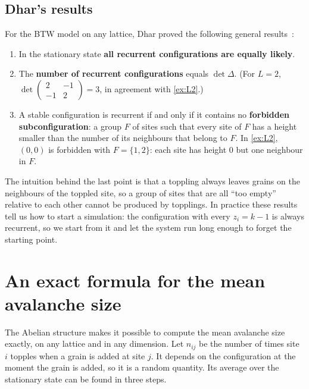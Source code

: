 \subsection{Dhar's results}

For the BTW model on any lattice, Dhar proved the following general results~\cite{Dhar1990,Dhar2006}:
\begin{enumerate}
  \item In the stationary state \textbf{all recurrent configurations are equally likely}.
  \item The \textbf{number of recurrent configurations} equals $\det\Delta$. (For $L=2$,
    $\det\begin{pmatrix}2&-1\\-1&2\end{pmatrix} = 3$, in agreement with \cref{ex:L2}.)
  \item A stable configuration is recurrent if and only if it contains no \textbf{forbidden subconfiguration}: a
    group $F$ of sites such that every site of $F$ has a height smaller than the number of its neighbours that
    belong to $F$. In \cref{ex:L2}, $(0,0)$ is forbidden with $F=\{1,2\}$: each site has height 0 but one neighbour in $F$.
\end{enumerate}
The intuition behind the last point is that a toppling always leaves grains on the neighbours of the toppled site, so
a group of sites that are all ``too empty'' relative to each other cannot be produced by topplings. In practice
these results tell us how to start a simulation: the configuration with every $z_i=k-1$ is always recurrent, so we
start from it and let the system run long enough to forget the starting point.

\section{An exact formula for the mean avalanche size}
\label{sec:mean}

The Abelian structure makes it possible to compute the mean avalanche size exactly, on any lattice and in any
dimension. Let $n_{ij}$ be the number of times site $i$ topples when a grain is added at site $j$. It depends on the
configuration at the moment the grain is added, so it is a random quantity. Its average over the stationary state can
be found in three steps.


